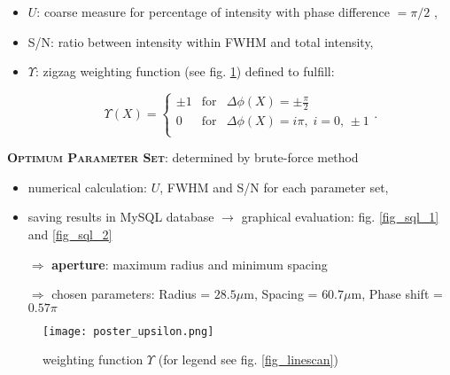 \documentclass[portrait]{sciposter}
\begin{document}
\begin{multicols}{3}
\begin{itemize}
\item $U$: coarse measure for percentage of intensity with  phase difference $= \pi/2$ ,
\item S/N: ratio between intensity within FWHM and total intensity,
\item $\Upsilon$: zigzag weighting function (see fig. \ref{fig_upsilon}) defined to fulfill:

\begin{equation}
\Upsilon(X) = \left\{\begin{array}{rcl}
\pm1 &\mathrm{for}& \Delta\phi(X) = \pm\frac{\pi}{2} \\
0 &\mathrm{for}& \Delta\phi(X) = i\pi,\;i=0,\,\pm1 \\
\end{array}\right. .\nonumber
\end{equation}
\end{itemize}

\textbf{\scshape Optimum Parameter Set}: determined by brute-force method
\begin{itemize}
\item numerical calculation: $U$, FWHM and S/N for each parameter set,
\item saving results in MySQL database $\to$ graphical evaluation: fig. \ref{fig_sql_1} and \ref{fig_sql_2}
\item[$\Rightarrow$] \textbf{aperture}: maximum radius and minimum spacing
\item[$\Rightarrow$] chosen parameters: Radius = $28.5\mu$m, Spacing = $60.7\mu$m, Phase shift = $0.57\pi$
\end{itemize}

\begin{figure}[h]
\begin{center}
\texttt{[image: poster\_upsilon.png]}
\end{center}
\caption{weighting function $\Upsilon$ (for legend see fig. \ref{fig_linescan})}
\label{fig_upsilon}
\end{figure}



\end{multicols}
\end{document}
